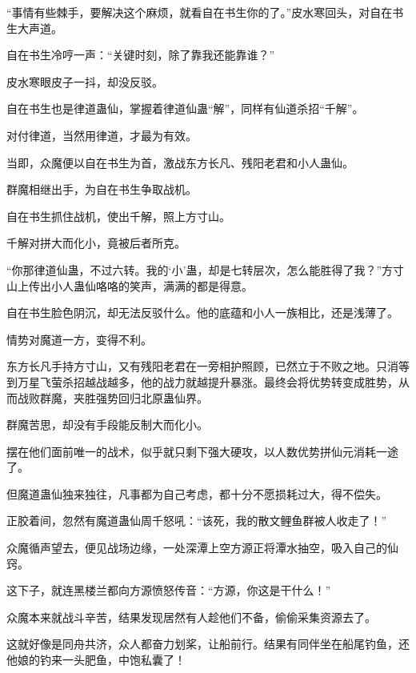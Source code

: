 \begin{this_body}
“事情有些棘手，要解决这个麻烦，就看自在书生你的了。”皮水寒回头，对自在书生大声道。

自在书生冷哼一声：“关键时刻，除了靠我还能靠谁？”

皮水寒眼皮子一抖，却没反驳。

自在书生也是律道蛊仙，掌握着律道仙蛊“解”，同样有仙道杀招“千解”。

对付律道，当然用律道，才最为有效。

当即，众魔便以自在书生为首，激战东方长凡、残阳老君和小人蛊仙。

群魔相继出手，为自在书生争取战机。

自在书生抓住战机，使出千解，照上方寸山。

千解对拼大而化小，竟被后者所克。

“你那律道仙蛊，不过六转。我的‘小’蛊，却是七转层次，怎么能胜得了我？”方寸山上传出小人蛊仙咯咯的笑声，满满的都是得意。

自在书生脸色阴沉，却无法反驳什么。他的底蕴和小人一族相比，还是浅薄了。

情势对魔道一方，变得不利。

东方长凡手持方寸山，又有残阳老君在一旁相护照顾，已然立于不败之地。只消等到万星飞萤杀招越战越多，他的战力就越提升暴涨。最终会将优势转变成胜势，从而战败群魔，夹胜强势回归北原蛊仙界。

群魔苦思，却没有手段能反制大而化小。

摆在他们面前唯一的战术，似乎就只剩下强大硬攻，以人数优势拼仙元消耗一途了。

但魔道蛊仙独来独往，凡事都为自己考虑，都十分不愿损耗过大，得不偿失。

正胶着间，忽然有魔道蛊仙周千怒吼：“该死，我的散文鲤鱼群被人收走了！”

众魔循声望去，便见战场边缘，一处深潭上空方源正将潭水抽空，吸入自己的仙窍。

这下子，就连黑楼兰都向方源愤怒传音：“方源，你这是干什么！”

众魔本来就战斗辛苦，结果发现居然有人趁他们不备，偷偷采集资源去了。

这就好像是同舟共济，众人都奋力划桨，让船前行。结果有同伴坐在船尾钓鱼，还他娘的钓来一头肥鱼，中饱私囊了！

\end{this_body}

